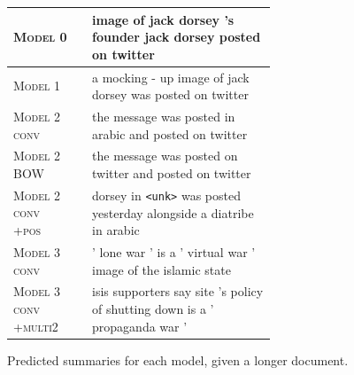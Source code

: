 \documentclass[12pt]{report}
\begin{document}
\begin{figure}[p]
\begin{tabular}{ll p{0.7\linewidth}}
\textsc{Model 0} & & image of jack dorsey 's founder jack dorsey posted on twitter \\
\midrule
 \textsc{Model 1} & & a mocking - up image of jack dorsey was posted on twitter \\
\midrule
\textsc{Model 2 conv} & & the message was posted in arabic and posted on twitter \\
\textsc{Model 2 BOW} & &  the message was posted on twitter and posted on twitter \\
\textsc{Model 2 conv +pos} & & dorsey in \texttt{<unk>} was posted yesterday alongside a diatribe in arabic \\
\midrule
\textsc{Model 3 conv} & & ' lone war ' is a ' virtual war ' image of the islamic state \\
\textsc{Model 3 conv +multi2} & &  isis supporters say site 's policy of shutting down is a ' propaganda war ' \\
\bottomrule
\end{tabular}
\caption{Predicted summaries for each model, given a longer document.}
\label{fig:predicted_summaries2}
\end{figure}
\end{document}
